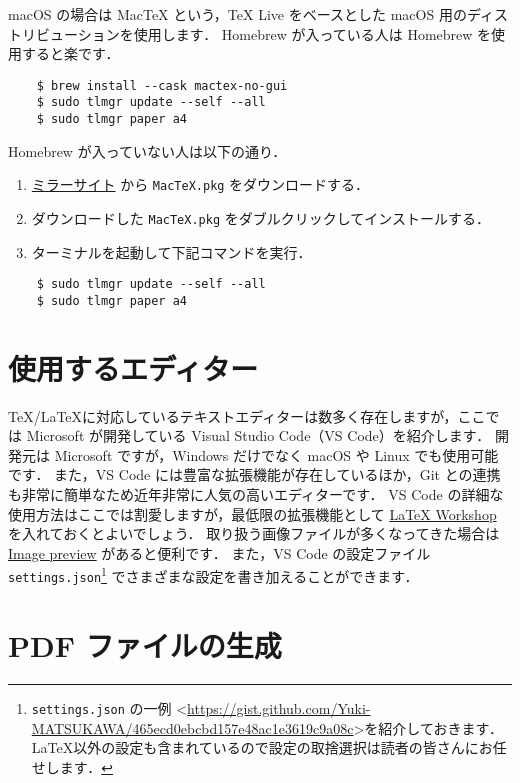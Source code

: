 macOS の場合は MacTeX という，TeX Live をベースとした macOS 用のディストリビューションを使用します．
Homebrew が入っている人は Homebrew を使用すると楽です．
\begin{verbatim}
    $ brew install --cask mactex-no-gui
    $ sudo tlmgr update --self --all
    $ sudo tlmgr paper a4
\end{verbatim}
Homebrew が入っていない人は以下の通り．
\begin{enumerate}
    \item \href{https://mirror.ctan.org/systems/mac/mactex/}{ミラーサイト} から \verb|MacTeX.pkg| をダウンロードする．
    \item ダウンロードした \verb|MacTeX.pkg| をダブルクリックしてインストールする．
    \item ターミナルを起動して下記コマンドを実行．
\end{enumerate}
\begin{verbatim}
    $ sudo tlmgr update --self --all
    $ sudo tlmgr paper a4
\end{verbatim}

\section{使用するエディター}
\label{sec:editor}

\TeX/\LaTeX に対応しているテキストエディターは数多く存在しますが，ここでは Microsoft が開発している Visual Studio Code（VS Code）を紹介します．
開発元は Microsoft ですが，Windows だけでなく macOS や Linux でも使用可能です．
また，VS Code には豊富な拡張機能が存在しているほか，Git との連携も非常に簡単なため近年非常に人気の高いエディターです．
VS Code の詳細な使用方法はここでは割愛しますが，最低限の拡張機能として \href{https://marketplace.visualstudio.com/items?itemName=James-Yu.latex-workshop}{LaTeX Workshop} を入れておくとよいでしょう．
取り扱う画像ファイルが多くなってきた場合は \href{https://marketplace.visualstudio.com/items?itemName=kisstkondoros.vscode-gutter-preview}{Image preview} があると便利です．
また，VS Code の設定ファイル \verb|settings.json|\footnote{\texttt{settings.json} の一例 \textless\url{https://gist.github.com/Yuki-MATSUKAWA/465ecd0ebcbd157e48ac1e3619c9a08c}\textgreater を紹介しておきます．\LaTeX 以外の設定も含まれているので設定の取捨選択は読者の皆さんにお任せします．} でさまざまな設定を書き加えることができます．

\section{PDF ファイルの生成}
\label{sec:makepdf}

